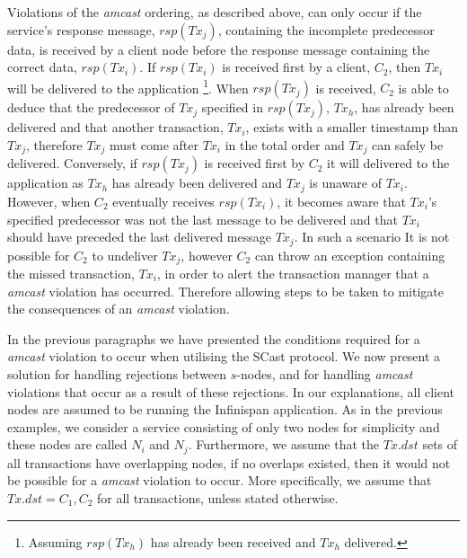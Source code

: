 Violations of the \emph{amcast} ordering, as described above, can only occur if the service's response message, $rsp(Tx_j)$, containing the incomplete predecessor data, is received by a client node before the response message containing the correct data, $rsp(Tx_i)$.  If $rsp(Tx_i)$ is received first by a client, $C_2$, then $Tx_i$ will be delivered to the application \footnote{Assuming $rsp(Tx_h)$ has already been received and $Tx_h$ delivered.}.  When $rsp(Tx_j)$ is received, $C_2$ is able to deduce that the predecessor of $Tx_j$ specified in $rsp(Tx_j)$, $Tx_h$, has already been delivered and that another transaction, $Tx_i$, exists with a smaller timestamp than $Tx_j$, therefore $Tx_j$ must come after $Tx_i$ in the total order and $Tx_j$ can safely be delivered. Conversely, if $rsp(Tx_j)$ is received first by $C_2$ it will delivered to the application as $Tx_h$ has already been delivered and $Tx_j$ is unaware of $Tx_i$.  However, when $C_2$ eventually receives $rsp(Tx_i)$, it becomes aware that $Tx_i$'s specified predecessor was not the last message to be delivered and that $Tx_i$ should have preceded the last delivered message $Tx_j$.  In such a scenario It is not possible for $C_2$ to undeliver $Tx_j$, however $C_2$ can throw an exception containing the missed transaction, $Tx_i$, in order to alert the transaction manager that a \emph{amcast} violation has occurred.  Therefore allowing steps to be taken to mitigate the consequences of an \emph{amcast} violation.  

In the previous paragraphs we have presented the conditions required for a \emph{amcast} violation to occur when utilising the \textsf{SCast} protocol.  We now present a solution for handling rejections between $s$-nodes, and for handling \emph{amcast} violations that occur as a result of these rejections.  In our explanations, all client nodes are assumed to be running the Infinispan application.  As in the previous examples, we consider a service consisting of only two nodes for simplicity and these nodes are called $N_i$ and $N_j$.  Furthermore, we assume that the $Tx.dst$ sets of all transactions have overlapping nodes, if no overlaps existed, then it would not be possible for a \emph{amcast} violation to occur.  More specifically, we assume that $Tx.dst = {C_1,C_2}$ for all transactions, unless stated otherwise.  

